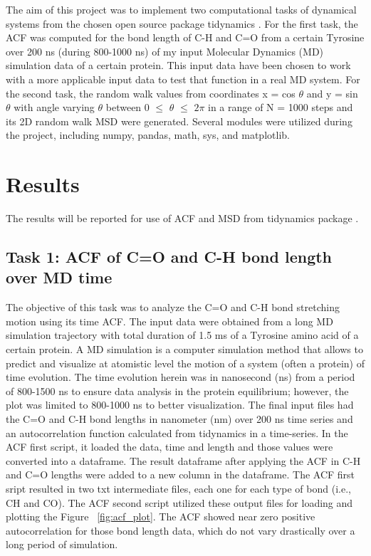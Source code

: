 \documentclass{article}
\begin{document}
The aim of this project was to implement two computational tasks of dynamical systems from the chosen open source package tidynamics \cite{Buyl2018}. For the first task, the ACF was computed for the bond length of C-H and C=O from a certain Tyrosine over 200 ns (during 800-1000 ns) of my input Molecular Dynamics (MD) simulation data of a certain protein. This input data have been chosen to work with a more applicable input data to test that function in a real MD system. For the second task, the random walk values from coordinates x = cos $\theta$ and y = sin $\theta$ with angle varying $\theta$ between 0 $\leq$ $\theta$ $\leq$ $2\pi$ in a range of N = 1000 steps and its 2D random walk MSD were generated. Several modules were utilized during the project, including numpy, pandas, math, sys, and matplotlib.

\section{Results}

The results will be reported for use of ACF and MSD from tidynamics package \cite{Buyl2018}.

\subsection{Task 1: ACF of C=O and C-H bond length over MD time}

The objective of this task was to analyze the C=O and C-H bond stretching motion using its time ACF. The input data were obtained from a long MD simulation trajectory with total duration of 1.5 ms of a Tyrosine amino acid of a certain protein. A MD simulation is a computer simulation method that allows to predict and visualize at atomistic level the motion of a system (often a protein) of time evolution. The time evolution herein was in nanosecond (ns) from a period of 800-1500 ns to ensure data analysis in the protein equilibrium; however, the plot was limited to 800-1000 ns to better visualization. The final input files had the C=O and C-H bond lengths in nanometer (nm) over 200 ns time series and an autocorrelation function calculated from tidynamics \cite{Buyl2018}in a time-series. In the ACF first script, it loaded the data, time and length and those values were converted into a dataframe. The result dataframe after applying the ACF in C-H and C=O lengths were added to a new column in the dataframe. The ACF first sript resulted in two txt intermediate files, each one for each type of bond (i.e., CH and CO). The ACF second script utilized these output files for loading and plotting the Figure ~\ref{fig:acf_plot}. The ACF showed near zero positive autocorrelation for those bond length data, which do not vary drastically over a long period of simulation.
\end{document}
